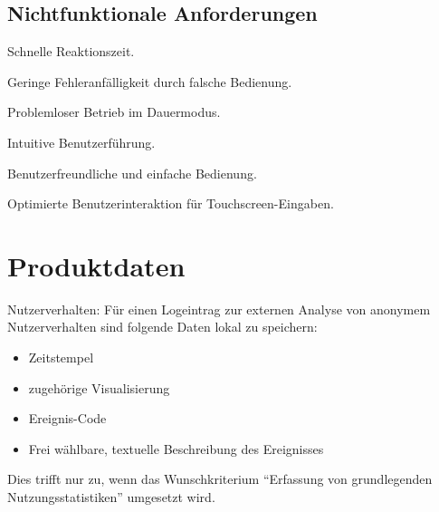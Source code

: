 \documentclass{article}
\begin{document}
\subsection{Nichtfunktionale Anforderungen}

\begin{NA}[start=100]
\item Schnelle Reaktionszeit.
\end{NA}

\begin{NA}[start=200]
\item Geringe Fehleranfälligkeit durch falsche Bedienung.
\end{NA}

\begin{NA}[start=300]
\item Problemloser Betrieb im Dauermodus.
\end{NA}

\begin{NA}[start=400]
\item Intuitive Benutzerführung.
\end{NA}

\begin{NA}[start=500]
\item Benutzerfreundliche und einfache Bedienung.
\end{NA}

\begin{NA}[start=600]
\item Optimierte Benutzerinteraktion für Touchscreen-Eingaben.
\end{NA}

\section{Produktdaten}
\begin{PD}[start=10]
  \item Nutzerverhalten: Für einen Logeintrag zur externen Analyse von anonymem Nutzerverhalten sind folgende Daten lokal zu speichern:
  \begin{itemize}
    \item Zeitstempel
    \item zugehörige Visualisierung
    \item Ereignis-Code
    \item Frei wählbare, textuelle Beschreibung des Ereignisses
  \end{itemize}
  Dies trifft nur zu, wenn das Wunschkriterium ``Erfassung von grundlegenden Nutzungsstatistiken'' umgesetzt wird.
\end{PD}
\end{document}
